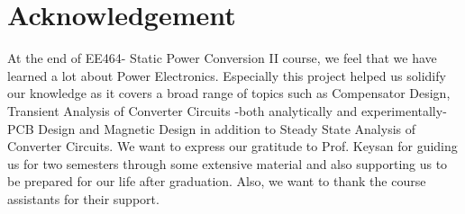 \section{Acknowledgement}
At the end of EE464- Static Power Conversion II course, we feel that we have learned a lot about Power Electronics. Especially this project helped us solidify our knowledge as it covers a broad range of topics such as Compensator Design, Transient Analysis of Converter Circuits -both analytically and experimentally- PCB Design and Magnetic Design in addition to Steady State Analysis of Converter Circuits. We want to express our gratitude to Prof. Keysan for guiding us for two semesters through some extensive material and also supporting us to be prepared for our life after graduation. Also, we want to thank the course assistants for their support.